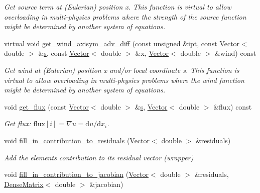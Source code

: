 \begin{DoxyCompactItemize}
\begin{DoxyCompactList}\small\item\em Get source term at (Eulerian) position x. This function is virtual to allow overloading in multi-\/physics problems where the strength of the source function might be determined by another system of equations. \end{DoxyCompactList}\item 
virtual void \hyperlink{classoomph_1_1SteadyAxisymAdvectionDiffusionEquations_a256417c37083a6146991b4d2098e0fa4}{get\+\_\+wind\+\_\+axisym\+\_\+adv\+\_\+diff} (const unsigned \&ipt, const \hyperlink{classoomph_1_1Vector}{Vector}$<$ double $>$ \&\hyperlink{cfortran_8h_ab7123126e4885ef647dd9c6e3807a21c}{s}, const \hyperlink{classoomph_1_1Vector}{Vector}$<$ double $>$ \&x, \hyperlink{classoomph_1_1Vector}{Vector}$<$ double $>$ \&wind) const
\begin{DoxyCompactList}\small\item\em Get wind at (Eulerian) position x and/or local coordinate s. This function is virtual to allow overloading in multi-\/physics problems where the wind function might be determined by another system of equations. \end{DoxyCompactList}\item 
void \hyperlink{classoomph_1_1SteadyAxisymAdvectionDiffusionEquations_a46303dd5c0af7fc086136779fcc9847c}{get\+\_\+flux} (const \hyperlink{classoomph_1_1Vector}{Vector}$<$ double $>$ \&\hyperlink{cfortran_8h_ab7123126e4885ef647dd9c6e3807a21c}{s}, \hyperlink{classoomph_1_1Vector}{Vector}$<$ double $>$ \&flux) const
\begin{DoxyCompactList}\small\item\em Get flux\+: $ \mbox{flux}[i] = \nabla u = \mbox{d}u / \mbox{d}x_i $. \end{DoxyCompactList}\item 
void \hyperlink{classoomph_1_1SteadyAxisymAdvectionDiffusionEquations_a7e42c76888ac644f855b17d9d7b3740b}{fill\+\_\+in\+\_\+contribution\+\_\+to\+\_\+residuals} (\hyperlink{classoomph_1_1Vector}{Vector}$<$ double $>$ \&residuals)
\begin{DoxyCompactList}\small\item\em Add the element\textquotesingle{}s contribution to its residual vector (wrapper) \end{DoxyCompactList}\item 
void \hyperlink{classoomph_1_1SteadyAxisymAdvectionDiffusionEquations_afb560268691d5b469b8998a6dfe758b8}{fill\+\_\+in\+\_\+contribution\+\_\+to\+\_\+jacobian} (\hyperlink{classoomph_1_1Vector}{Vector}$<$ double $>$ \&residuals, \hyperlink{classoomph_1_1DenseMatrix}{Dense\+Matrix}$<$ double $>$ \&jacobian)

\end{DoxyCompactItemize}
